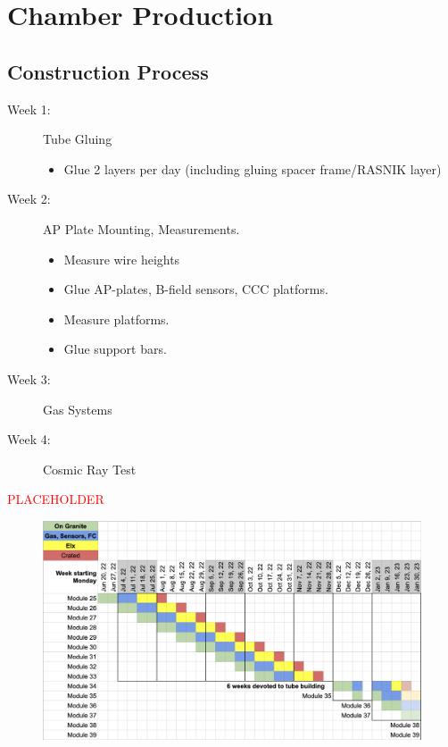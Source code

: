 \documentclass{beamer}
\def\ph{\textcolor{red}{PLACEHOLDER}}
\begin{document}
\section{Chamber Production}
	\subsection{Construction Process}
		\begin{frame}

			\begin{description}
				\item [Week 1:] \colorbox{googlegreen}{Tube Gluing}
					\begin{itemize}\small
						\item Glue 2 layers per day (including gluing spacer frame/RASNIK layer)
					\end{itemize}
				\item [Week 2:] \colorbox{googlegreen}{AP Plate Mounting, Measurements.}
					\begin{itemize}\small
						\item Measure wire heights 
						\item Glue AP-plates, B-field sensors, CCC platforms.
						\item Measure platforms.
						\item Glue support bars.
					\end{itemize}
				\item [Week 3:] \colorbox{googleblue}{Gas Systems}
				\item [Week 4:] \colorbox{googleyellow}{Cosmic Ray Test}
			\end{description}
		\end{frame}
		\begin{frame}{\ph}
			\begin{figure}[t]
				\centering
				\includegraphics[width=0.8\pdfpagewidth]{Chamber Production.png}		
				\label{fig:ChamberProduction}		
			\end{figure}
		\end{frame}
\end{document}
